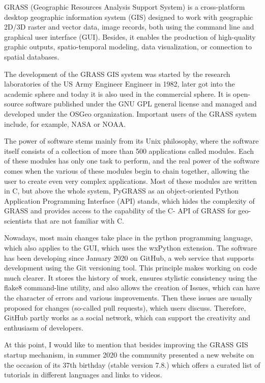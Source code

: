 \documentclass[a4paper,10pt,twoside]{article}
\begin{document}
\noindent GRASS (Geographic Resources Analysis Support System) is a cross-platform desktop geographic information system (GIS) designed to work with geographic 2D/3D raster and vector data, image records, both using the command line and graphical user interface (GUI). Besides, it enables the production of high-quality graphic outputs, spatio-temporal modeling, data visualization, or connection to spatial databases.

The development of the GRASS GIS system was started by the research laboratories of the US Army Engineer Engineer in 1982, later got into the academic sphere and today it is also used in the commercial sphere. It is open-source software published under the GNU GPL general license and managed and developed under the OSGeo organization. Important users of the GRASS system include, for example, NASA or NOAA.

The power of software stems mainly from its Unix philosophy, where the software itself consists of a collection of more than 500 applications called modules. Each of these modules has only one task to perform, and the real power of the software comes when the various of these modules begin to chain together, allowing the user to create even very complex applications. Most of these modules are written in C, but above the whole system, PyGRASS as an object-oriented Python Application Programming Interface (API) stands, which hides the complexity of GRASS and provides access to the capability of the C- API of GRASS for geo-scientists that are not familiar with C.

Nowadays, most main changes take place in the python programming language, which also applies to the GUI, which uses the wxPython extension. The software has been developing since January 2020 on GitHub, a web service that supports development using the Git versioning tool. This principle makes working on code much clearer. It stores the history of work, ensures stylistic consistency using the flake8 command-line utility, and also allows the creation of Issues, which can have the character of errors and various improvements. Then these issues are usually proposed for changes (so-called pull requests), which users discuss. Therefore, GitHub partly works as a social network, which can support the creativity and enthusiasm of developers.

At this point, I would like to mention that besides improving the GRASS GIS startup mechanism, in summer 2020 the community presented a new website on the occasion of its 37th birthday (stable version 7.8.) which offers a curated list of tutorials in different languages and links to videos.
\end{document}
